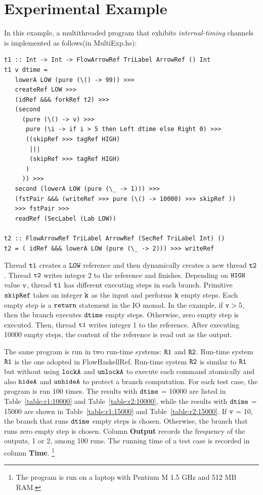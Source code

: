 \documentclass{report}
\newcommand{\co}[1]{$\cod{#1}$}
\begin{document}
\section{Experimental Example}
\label{chap8:expexample}
In this example, a multithreaded program that exhibits {\em internal-timing} channels is implemented
as follows(in MultiExp.hs):
\begin{Verbatim}[fontsize=\small]
t1 :: Int -> Int -> FlowArrowRef TriLabel ArrowRef () Int
t1 v dtime = 
   lowerA LOW (pure (\() -> 99)) >>>
   createRef LOW >>>
   (idRef &&& forkRef t2) >>>
   (second
     (pure (\() -> v) >>>
      pure (\i -> if i > 5 then Left dtime else Right 0) >>>
      ((skipRef >>> tagRef HIGH)
       |||
       (skipRef >>> tagRef HIGH)
      )
     )) >>>
   second (lowerA LOW (pure (\_ -> 1))) >>> 
   (fstPair &&& (writeRef >>> pure (\() -> 10000) >>> skipRef ))
   >>> fstPair >>>
   readRef (SecLabel (Lab LOW))

t2 :: FlowArrowRef TriLabel ArrowRef (SecRef TriLabel Int) ()
t2 = ( idRef &&& lowerA LOW (pure (\_ -> 2))) >>> writeRef
\end{Verbatim}
Thread \co{t1} creates a \co{LOW} reference and then dynamically creates a new thread \co{t2}.
Thread \co{t2} writes integer 2 to the reference and finishes.
Depending on \co{HIGH} value \co{v}, thread \co{t1} has different executing steps in each branch.
Primitive \co{skipRef} takes an integer \co{k} as the input and performs \co{k} empty steps.
Each empty step is a \co{return} statement in the IO monad.
In the example, if $\mathtt{v}>5$, then the branch executes \co{dtime} empty steps. Otherwise, zero
empty step is executed. Then, thread \co{t1} writes integer 1 to the reference. After executing 10000
empty steps, the content of the reference is read out as the output.

The same program is run in two run-time systems: \co{R1} and \co{R2}.
Run-time system \co{R1} is the one adopted in FlowHaskellRef.
Run-time system \co{R2} is similar to \co{R1} but without using \co{lockA} and \co{unlockA} to execute each
command atomically and also \co{hideA} and \co{unhideA} to protect a branch computation.
For each test case, the program is run 100 times. 
The results with \co{dtime} = 10000 are listed in Table~\ref{table:r1:10000} and Table~\ref{table:r2:10000},
while the results with \co{dtime} = 15000 are shown in Table~\ref{table:r1:15000} and Table~\ref{table:r2:15000}.
If \co{v} = 10, the branch that runs \co{dtime} empty steps is chosen. Otherwise, the branch that
runs zero empty step is chosen. Column {\bf Output} records the frequency of the outputs, 1 or 2, among
100 runs. The running time of a test case is recorded in column {\bf Time}.
\footnote{The program is run on a laptop with Pentium M 1.5 GHz and 512 MB RAM.}
\end{document}
